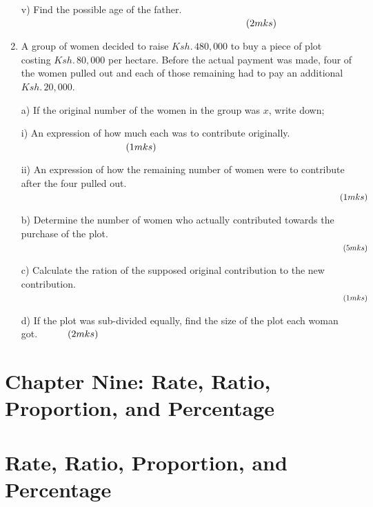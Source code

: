 \documentclass[
  letterpaper,
  DIV=11,
  numbers=noendperiod]{scrreprt}
\begin{document}
\begin{tcolorbox}
\begin{enumerate}
  v) Find the possible age of the father. \(\hspace{8.2 cm} (2mks)\)
\item
  A group of women decided to raise \(Ksh. \, 480, 000\) to buy a piece
  of plot costing \(Ksh.\, 80, 000\) per hectare. Before the actual
  payment was made, four of the women pulled out and each of those
  remaining had to pay an additional \(Ksh. \,20, 000\).

  a) If the original number of the women in the group was \(x\), write
  down;

  i) An expression of how much each was to contribute originally.
  \(\hspace{3.8 cm} (1mks)\)

  ii) An expression of how the remaining number of women were to
  contribute after the four pulled out. \(\hspace{12.7cm} (1mks)\)

  b) Determine the number of women who actually contributed towards the
  purchase of the plot. \(\hspace{14.6 cm}(5mks)\)

  c) Calculate the ration of the supposed original contribution to the
  new contribution. \(\hspace{14.6 cm}(1mks)\)

  d) If the plot was sub-divided equally, find the size of the plot each
  woman got.\(\hspace{1.1 cm} (2mks)\)
\end{enumerate}

\end{tcolorbox}


\hypertarget{chapter-nine-rate-ratio-proportion-and-percentage}{%
\chapter{Chapter Nine: Rate, Ratio, Proportion, and
Percentage}\label{chapter-nine-rate-ratio-proportion-and-percentage}}


\hypertarget{rate-ratio-proportion-and-percentage}{%
\chapter*{Rate, Ratio, Proportion, and
Percentage}\label{rate-ratio-proportion-and-percentage}}
\end{document}
